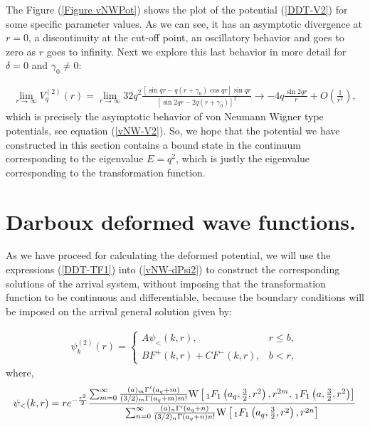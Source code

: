 \documentclass[a4paper]{jpconf}
\begin{document}
The Figure (\ref{Figure vNWPot}) shows the plot of  the potential (\ref{DDT-V2}) for some specific parameter values. As we can see, it has an asymptotic divergence at $r=0$, a discontinuity at the cut-off point, an oscillatory behavior and goes to zero as $r$ goes to infinity. Next we explore this last behavior in more detail for $\delta=0$ and $\gamma_0\neq 0$:

\begin{eqnarray*}
\lim_{r\rightarrow\infty} V_q^{(2)}(r)=\lim_{r\rightarrow\infty} 32q^2\frac{[\sin{qr}-q(r+\gamma_0)\cos{qr}]\sin{qr}}{[\sin{2qr}-2q(r+\gamma_0)]^2}\rightarrow -4q\frac{\sin{2qr}}{r}+O\left(\frac{1}{r^2}\right),
\end{eqnarray*}
which is precisely the asymptotic behavior of von Neumann Wigner type potentials, see equation (\ref{vNW-V2}). So, we hope that the potential we have constructed in this section  contains a bound state in the continuum corresponding to the eigenvalue $E=q^2$, which is justly the eigenvalue corresponding to the transformation function.

\section{Darboux deformed wave functions.}

As we have proceed for calculating the deformed potential, we will use the expressions (\ref{DDT-TF1})  into (\ref{vNW-dPsi2}) to construct the corresponding solutions of the arrival system, without imposing that the transformation function to be continuous and differentiable, because the boundary conditions will be imposed on the arrival general solution given by: 


\begin{eqnarray}
\psi_k^{(2)}(r)=\left\{
\begin{array}{cc}
 A\psi_{<}(k,r), & r\leq b,  \\[0.2cm]
B F^{+}(k,r)+C F^{-}(k,r),&b<r ,
\end{array}
\right.\label{DDWF}
\end{eqnarray}
where, 
\begin{equation}
\psi_{<}(k,r)=re^{-\frac{r^{2}}{2}}\frac{\sum_{m=0}^{\infty}\frac{(a)_{m}\Gamma'(a_{q}+m)}{(3/2)_{m}\Gamma(a_{q}+m)m!}{\rm W}\left[\, _1F_1\left(a_{q},\frac{3}{2},r^{2}\right),r^{2m},\, _1F_1\left(a,\frac{3}{2},r^{2}\right)\right]}{\sum_{n=0}^{\infty}\frac{(a)_{n}\Gamma'(a_{q}+n)}{(3/2)_{n}\Gamma(a_{q}+n)n!}{\rm W}\left[\, _1F_1\left(a_{q},\frac{3}{2},r^{2}\right),r^{2n}\right]}\label{Psi<}
\end{equation}
\end{document}
